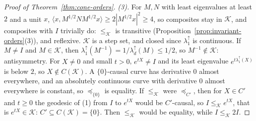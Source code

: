 \begin{proof}[Proof of Theorem~\ref{thm:cone-orders}]
\emph{(3).} For $M, N$ with least eigenvalues at least $2$ and a unit $x$,
$\langle x, M^{1/2}NM^{1/2}x\rangle \ge 2|M^{1/2}x|^2 \ge 4$, so composites stay in $\mathcal K$, and
composites with $I$ trivially do: $\le_{\mathcal K}$ is transitive (Proposition~\ref{prop:invariant-orders}(3)), and
reflexive. $\mathcal K$ is a step set, and closed since $\lambda^\uparrow_1$ is continuous. If $M \ne I$ and
$M \in \mathcal K$, then $\lambda^\uparrow_1(M^{-1}) = 1/\lambda^\uparrow_d(M) \le 1/2$, so $M^{-1} \notin
\mathcal K$: antisymmetry. For $X \ne 0$ and small $t > 0$, $e^{tX} \ne I$ and its least eigenvalue
$e^{t\lambda^\uparrow_1(X)}$ is below $2$, so $X \notin C(\mathcal K)$. A $\{0\}$-causal curve has
derivative $0$ almost everywhere, and an absolutely continuous curve with derivative $0$ almost everywhere is
constant, so $\preceq_{\{0\}}$ is equality. If $\le_{\mathcal K}$ were $\preceq_{C'}$, then for $X \in C'$ and
$t \ge 0$ the geodesic of (1) from $I$ to $e^{tX}$ would be $C'$-causal, so $I \le_{\mathcal K} e^{tX}$, that is
$e^{tX} \in \mathcal K$: $C' \subseteq C(\mathcal K) = \{0\}$. Then $\le_{\mathcal K}$ would be equality,
while $I \le_{\mathcal K} 2I$.


\end{proof}

